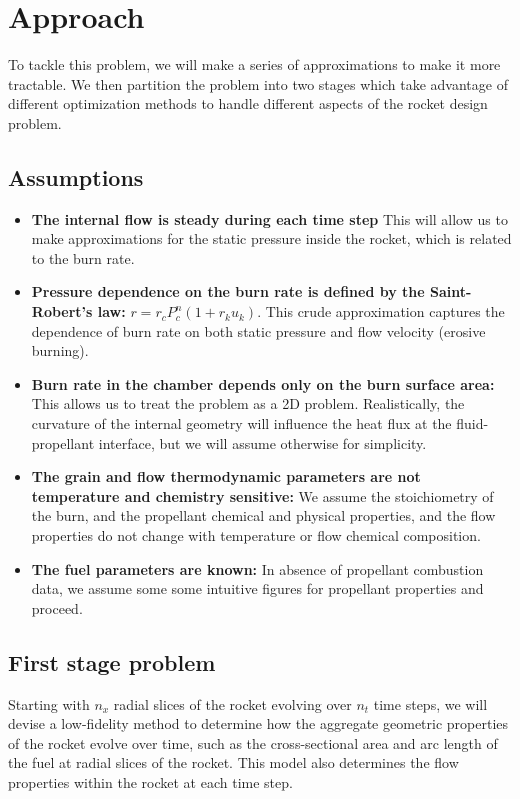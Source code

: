 \section{Approach}

To tackle this problem, we will make a series of approximations to make it more tractable.
We then partition the problem into two stages which take advantage of different optimization
methods to handle different aspects of the rocket design problem.

\subsection{Assumptions}
\label{sec:assumptions}

\begin{itemize}
	\item \textbf{The internal flow is steady during each time step} This will allow us to make approximations
	for the static pressure inside the rocket,	which is related to the burn rate.
	\item \textbf{Pressure dependence on the burn rate is defined by the Saint-Robert's law:} $r = r_c P_c^n (1+r_k u_k)$.
		This crude approximation captures the dependence of burn rate on both static pressure and flow velocity (erosive burning).
	\item \textbf{Burn rate in the chamber depends only on the burn surface area:}
	    This allows us to treat the problem as a 2D problem.
		Realistically, the curvature of the internal geometry will influence the heat flux at the fluid-propellant interface,
		but we will assume otherwise for simplicity.
	\item \textbf{The grain and flow thermodynamic parameters are not temperature and chemistry sensitive:}
		We assume the stoichiometry of the burn, and the propellant
		chemical and physical properties, and the flow properties do not change with temperature or flow chemical composition.
	\item \textbf{The fuel parameters are known:} In absence of propellant combustion data, we assume some
		some intuitive figures for propellant properties and proceed.
\end{itemize}

\subsection{First stage problem}

Starting with $n_{x}$ radial slices of the rocket evolving over $n_t$ time steps,
we will devise a low-fidelity method to determine how the aggregate geometric properties of the rocket
evolve over time, such as the cross-sectional area and arc length of the fuel at radial slices of the rocket.
This model also determines
the flow properties within the rocket at each time step.

